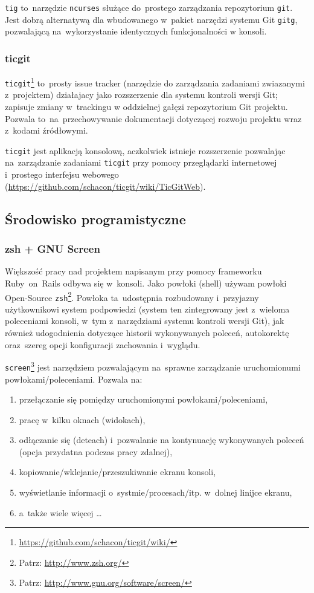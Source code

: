 \texttt{tig} to~narzędzie \texttt{ncurses} służące do~prostego zarządzania repozytorium \texttt{git}. Jest dobrą alternatywą dla wbudowanego w~pakiet narzędzi systemu Git \texttt{gitg}, pozwalającą na~wykorzystanie identycznych funkcjonalności w konsoli.

\subsubsection{ticgit}

\texttt{ticgit}\footnote{\url{https://github.com/schacon/ticgit/wiki/}} to~prosty issue tracker (narzędzie do zarządzania zadaniami zwiazanymi z~projektem) działajacy jako rozszerzenie dla systemu kontroli wersji Git; zapisuje zmiany w~trackingu w oddzielnej gałęzi repozytorium Git projektu. Pozwala to~na~przechowywanie dokumentacji dotyczącej rozwoju projektu wraz z~kodami źródłowymi.

\texttt{ticgit} jest aplikacją konsolową, aczkolwiek istnieje rozszerzenie pozwalając na~zarządzanie zadaniami \texttt{ticgit} przy pomocy przeglądarki internetowej i~prostego interfejsu webowego (\url{https://github.com/schacon/ticgit/wiki/TicGitWeb}).

\subsection{Środowisko programistyczne}

\subsubsection{zsh + GNU Screen}

Większość pracy nad projektem napisanym przy pomocy frameworku Ruby~on~Rails odbywa się w~konsoli. Jako powłoki (shell) używam powłoki Open-Source \texttt{zsh}\footnote{Patrz: \url{http://www.zsh.org/}}. Powłoka ta~udostępnia rozbudowany i~przyjazny użytkownikowi system podpowiedzi (system ten zintegrowany jest z~wieloma poleceniami konsoli, w~tym z~narzędziami systemu kontroli wersji Git), jak również udogodnienia dotyczące historii wykonywanych poleceń, autokorektę oraz~szereg opcji konfiguracji zachowania i~wyglądu.


\texttt{screen}\footnote{Patrz: \url{http://www.gnu.org/software/screen/}} jest narzędziem pozwalającym na~sprawne zarządzanie uruchomionumi powłokami/poleceniami. Pozwala na:

\begin{enumerate}
  \item przełączanie się pomiędzy uruchomionymi powłokami/poleceniami,
  \item pracę w~kilku oknach (widokach),
  \item odłączanie się (deteach) i~pozwalanie na kontynuację wykonywanych poleceń (opcja przydatna podczas pracy zdalnej),
  \item kopiowanie/wklejanie/przeszukiwanie ekranu konsoli,
  \item wyświetlanie informacji o~systmie/procesach/itp. w~dolnej linijce ekranu,
  \item a~także wiele więcej \ldots
\end{enumerate}

